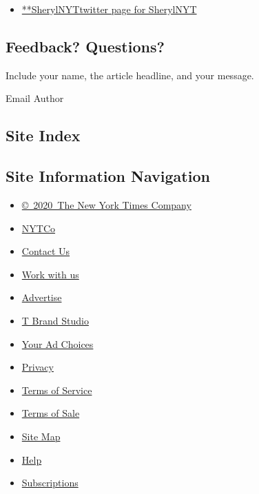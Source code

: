 \begin{itemize}
\tightlist
\item
  \href{https://twitter.com/SherylNYT}{**SherylNYTtwitter page for
  SherylNYT}
\end{itemize}

\hypertarget{feedback-questions}{%
\subsection{Feedback? Questions?}\label{feedback-questions}}

Include your name, the article headline, and your message.

Email Author

\hypertarget{site-index}{%
\subsection{Site Index}\label{site-index}}

\hypertarget{site-information-navigation}{%
\subsection{Site Information
Navigation}\label{site-information-navigation}}

\begin{itemize}
\tightlist
\item
  \href{https://help.nytimes.com/hc/en-us/articles/115014792127-Copyright-notice}{©~2020~The
  New York Times Company}
\end{itemize}

\begin{itemize}
\tightlist
\item
  \href{https://www.nytco.com/}{NYTCo}
\item
  \href{https://help.nytimes.com/hc/en-us/articles/115015385887-Contact-Us}{Contact
  Us}
\item
  \href{https://www.nytco.com/careers/}{Work with us}
\item
  \href{https://nytmediakit.com/}{Advertise}
\item
  \href{http://www.tbrandstudio.com/}{T Brand Studio}
\item
  \href{https://www.nytimes.com/privacy/cookie-policy\#how-do-i-manage-trackers}{Your
  Ad Choices}
\item
  \href{https://www.nytimes.com/privacy}{Privacy}
\item
  \href{https://help.nytimes.com/hc/en-us/articles/115014893428-Terms-of-service}{Terms
  of Service}
\item
  \href{https://help.nytimes.com/hc/en-us/articles/115014893968-Terms-of-sale}{Terms
  of Sale}
\item
  \href{https://spiderbites.nytimes.com}{Site Map}
\item
  \href{https://help.nytimes.com/hc/en-us}{Help}
\item
  \href{https://www.nytimes.com/subscription?campaignId=37WXW}{Subscriptions}
\end{itemize}
